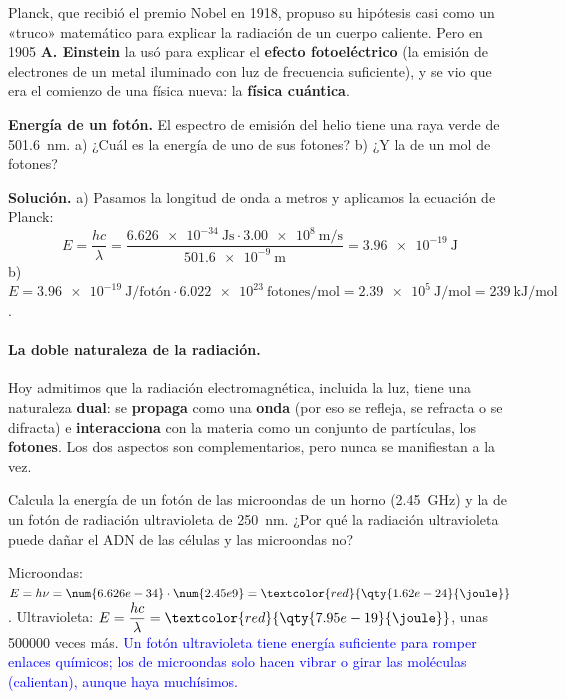 Planck, que recibió el premio Nobel en 1918, propuso su hipótesis casi como un «truco» matemático para explicar la radiación
de un cuerpo caliente. Pero en 1905 \textbf{A. Einstein} la usó para explicar el \textbf{efecto fotoeléctrico} (la emisión de
electrones de un metal iluminado con luz de frecuencia suficiente), y se vio que era el comienzo de una física nueva: la
\textbf{física cuántica}.

\begin{example}
    \textbf{Energía de un fotón.} El espectro de emisión del helio tiene una raya verde de \qty{501.6}{\nm}. a) ¿Cuál es la energía
    de uno de sus fotones? b) ¿Y la de un mol de fotones?

    \textbf{Solución.} a) Pasamos la longitud de onda a metros y aplicamos la ecuación de Planck:
    \[ E = \frac{h c}{\lambda} = \frac{\qty{6.626e-34}{\joule\s} \cdot \qty{3.00e8}{\m\per\s}}{\qty{501.6e-9}{\m}} = \qty{3.96e-19}{\joule} \]
    b) \(E = \qty{3.96e-19}{\joule}/\text{fotón} \cdot \num{6.022e23}\ \text{fotones}/\unit{\mol} = \qty{2.39e5}{\joule\per\mol} =
    \qty{239}{\kilo\joule\per\mol}\).
\end{example}

\paragraph{La doble naturaleza de la radiación.} Hoy admitimos que la radiación electromagnética, incluida la luz, tiene una
naturaleza \textbf{dual}: se \textbf{propaga} como una \textbf{onda} (por eso se refleja, se refracta o se difracta) e
\textbf{interacciona} con la materia como un conjunto de partículas, los \textbf{fotones}. Los dos aspectos son
complementarios, pero nunca se manifiestan a la vez.

\begin{exercise}
    Calcula la energía de un fotón de las microondas de un horno (\qty{2.45}{\giga\hertz}) y la de un fotón de radiación
    ultravioleta de \qty{250}{\nm}. ¿Por qué la radiación ultravioleta puede dañar el ADN de las células y las microondas no?
    \begin{solu}
        Microondas: \(E = h \nu = \num{6.626e-34} \cdot \num{2.45e9} = \textcolor{red}{\qty{1.62e-24}{\joule}}\). Ultravioleta:
        \(E = \dfrac{h c}{\lambda} = \textcolor{red}{\qty{7.95e-19}{\joule}}\), unas \num{500000} veces más.
        \textcolor{blue}{Un fotón ultravioleta tiene energía suficiente para romper enlaces químicos; los de microondas solo hacen
        vibrar o girar las moléculas (calientan), aunque haya muchísimos.}
    \end{solu}
\end{exercise}

